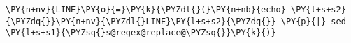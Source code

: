 \begin{Verbatim}[commandchars=\\\{\}]
\PY{n+nv}{LINE}\PY{o}{=}\PY{k}{\PYZdl{}(}\PY{n+nb}{echo} \PY{l+s+s2}{\PYZdq{}}\PY{n+nv}{\PYZdl{}LINE}\PY{l+s+s2}{\PYZdq{}} \PY{p}{|} sed \PY{l+s+s1}{\PYZsq{}s@regex@replace@\PYZsq{}}\PY{k}{)}
\end{Verbatim}
